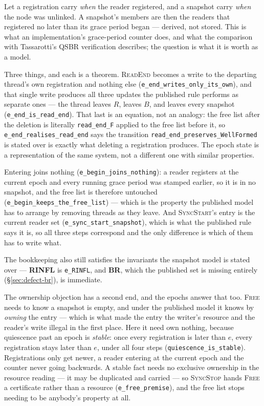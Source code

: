 Let a registration carry \emph{when} the reader registered, and a snapshot carry
\emph{when} the node was unlinked.  A snapshot's members are then the readers
that registered no later than its grace period began --- derived, not stored.
This is what an implementation's grace-period counter does, and what the
comparison with Tassarotti's QSBR verification describes;
the question is what it is worth as a model.

Three things, and each is a theorem.  \textsc{ReadEnd} becomes a write to the
departing thread's own registration and nothing else
(\texttt{e\_end\_writes\_only\_its\_own}), and that single write produces all
three updates the published rule performs as separate ones --- the thread leaves
$R$, leaves $B$, and leaves every snapshot (\texttt{e\_end\_is\_read\_end}).
That last is an equation, not an analogy: the free list after the deletion is
literally \texttt{read\_end\_F} applied to the free list before it, so
\texttt{e\_end\_realises\_read\_end} says the transition
\texttt{read\_end\_preserves\_WellFormed} is stated over is exactly what
deleting a registration produces.  The epoch state is a representation of the
same system, not a different one with similar properties.

Entering joins nothing (\texttt{e\_begin\_joins\_nothing}): a reader registers
at the current epoch and every running grace period was stamped earlier, so it
is in no snapshot, and the free list is therefore untouched
(\texttt{e\_begin\_keeps\_the\_free\_list}) --- which is the property the
published model has to arrange by removing threads as they leave.  And
\textsc{SyncStart}'s entry is the current reader set
(\texttt{e\_sync\_start\_snapshot}), which is what the published rule says it
is, so all three steps correspond and the only difference is which of them has
to write what.

The bookkeeping also still satisfies the invariants the snapshot model is stated
over --- \textbf{RINFL} is \texttt{e\_RINFL}, and \textbf{BR}, which the
published set is missing entirely (\S\ref{sec:defect-br}), is immediate.

The ownership objection has a second end, and the epochs answer that too.
\textsc{Free} needs to know a snapshot is empty, and under the published model
it knows by \emph{owning} the entry --- which is what made the entry the
writer's resource and the reader's write illegal in the first place.  Here it
need own nothing, because quiescence past an epoch is \emph{stable}: once every
registration is later than $e$, every registration stays later than $e$, under
all four steps (\texttt{quiescence\_is\_stable}).  Registrations only get newer,
a reader entering at the current epoch and the counter never going backwards.  A
stable fact needs no exclusive ownership in the resource reading --- it may be
duplicated and carried --- so \textsc{SyncStop} hands \textsc{Free} a
certificate rather than a resource (\texttt{e\_free\_premise}), and the free
list stops needing to be anybody's property at all.

